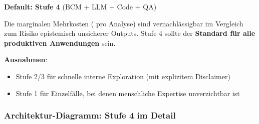 \begin{tcolorbox}[colback=blue!5!white, colframe=blue!75!black, title=Strategische Empfehlung]
\textbf{Default: Stufe 4} (BCM + LLM + Code + QA)

Die marginalen Mehrkosten ( pro Analyse) sind vernachlässigbar im Vergleich zum Risiko epistemisch unsicherer Outputs. Stufe 4 sollte der \textbf{Standard für alle produktiven Anwendungen} sein.

\textbf{Ausnahmen}:
\begin{itemize}
    \item Stufe 2/3 für schnelle interne Exploration (mit explizitem Disclaimer)
    \item Stufe 1 für Einzelfälle, bei denen menschliche Expertise unverzichtbar ist
\end{itemize}
\end{tcolorbox}

\subsubsection{Architektur-Diagramm: Stufe 4 im Detail}

